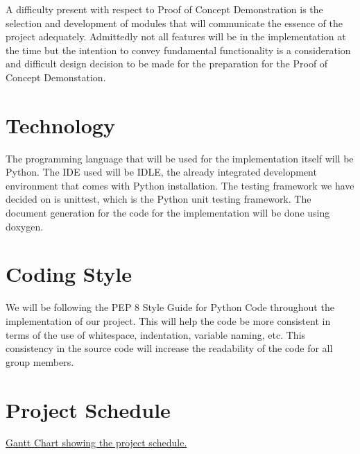 \documentclass[12pt]{article}
\begin{document}
A difficulty present with respect to Proof of Concept Demonstration is the selection and development of modules that will communicate the essence of the project adequately. Admittedly not all features will be in the implementation at the time but the intention to convey fundamental functionality is a consideration and difficult design decision to be made for the preparation for the Proof of Concept Demonstation. 

\section{Technology}

\tab The programming language that will be used for the implementation itself will be Python. The IDE used will be IDLE, the already integrated development environment that comes with Python installation. The testing framework we have decided on is unittest, which is the Python unit testing framework. The document generation for the code for the implementation will be done using doxygen. 

\section{Coding Style}

\tab We will be following the PEP 8 Style Guide for Python Code throughout the implementation of our project. This will help the code be more consistent in terms of the use of whitespace, indentation, variable naming, etc. This consistency in the source code will increase the readability of the code for all group members.

\section{Project Schedule}

   \href{3XA3 Gantt Chart.pdf}{Gantt Chart showing the project schedule.}
\end{document}
